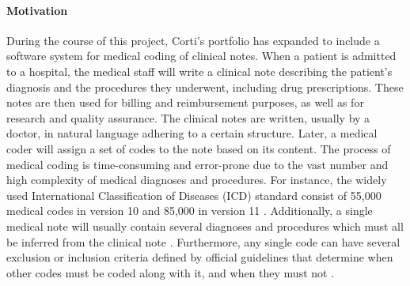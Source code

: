 \paragraph{Motivation} During the course of this project, Corti's portfolio has expanded to include a software system for medical coding of clinical notes. 
When a patient is admitted to a hospital, the medical staff will write a clinical note describing the patient's diagnosis and the procedures they underwent, including drug prescriptions. 
These notes are then used for billing and reimbursement purposes, as well as for research and quality assurance. 
The clinical notes are written, usually by a doctor, in natural language adhering to a certain structure. Later, a medical coder will assign a set of codes to the note based on its content. 
The process of medical coding is time-consuming and error-prone due to the vast number and high complexity of medical diagnoses and procedures. For instance, the widely used International Classification of Diseases (ICD) standard consist of 55,000 medical codes in version 10 and 85,000 in version 11 \parencite{worldhealthorganisationwho_international_2023}. Additionally, a single medical note will usually contain several diagnoses and procedures which must all be inferred from the clinical note \parencite{johnsonMIMICIIIFreelyAccessible2016,johnsonMIMICIVFreelyAccessible2023}. 
Furthermore, any single code can have several exclusion or inclusion criteria defined by official guidelines that determine when other codes must be coded along with it, and when they must not \parencite{centersformedicaremedicaidservicesus_icd10cm_2023}. 

